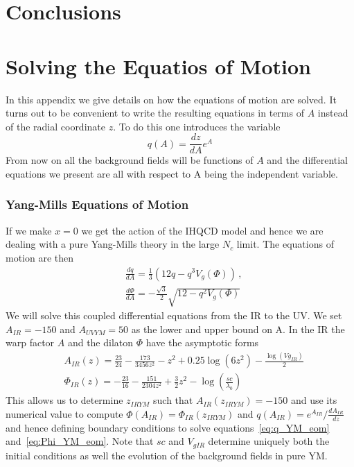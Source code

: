 \documentclass[a4paper,12pt]{article}
\begin{document}
\section{Conclusions}


\appendix

\section{Solving the Equatios of Motion}
\label{appendix:eom_sol}

In this appendix we give details on how the equations of motion are solved. It turns out to be convenient to write the resulting equations in terms of $A$ instead of the radial coordinate $z$. To do this one introduces the variable
\begin{equation}
q\left(A\right) = \frac{dz}{dA} e^{A}
\label{eq: q definition}
\end{equation}
From now on all the background fields will be functions of $A$ and the differential equations we present are all with respect to A being the independent variable.

\subsubsection*{Yang-Mills Equations of Motion}

If we make $x = 0$ we get the action of the IHQCD model and hence we are dealing with a pure Yang-Mills theory in the large $N_c$ limit. The equations of motion are then
\begin{align}
&\frac{dq}{dA} = \frac{1}{3} \left( 12 q - q^3 V_g \left(\Phi\right) \right) \, , \label{eq:q_YM_eom} \\
&\frac{d\Phi}{dA} = - \frac{\sqrt{3}}{2} \sqrt{12 - q^2 V_g\left(\Phi\right)} \label{eq:Phi_YM_eom}
\end{align}
We will solve this coupled differential equations from the IR to the UV. We set $A_{IR} = -150$ and $A_{UVYM} = 50$ as the lower and upper bound on A. In the IR the warp factor $A$ and the dilaton $\Phi$ have the asymptotic forms
\begin{align}
&A_{IR} \left(z\right) = \frac{23}{24} - \frac{173}{3456 z^2} - z^2 + 0.25 \log(6 z^2) - \frac{\log(Vg_{IR})}{2} \\
&\Phi_{IR} \left(z \right) = - \frac{23}{16} - \frac{151}{2304 z^2} + \frac{3}{2} z^2 - \log(\frac{sc}{\lambda_0})
\label{eq: YM fields IR asymptotics}
\end{align}
This allows us to determine $z_{IRYM}$ such that $A_{IR}\left(z_{IRYM}\right) = -150$ and use its numerical value to compute $\Phi\left(A_{IR}\right) = \Phi_{IR} \left( z_{IRYM}\right)$ and $q\left(A_{IR}\right) = e^{A_{IR}} / \frac{dA_{IR}}{d z} $ and hence defining boundary conditions to solve equations~\ref{eq:q_YM_eom} and~\ref{eq:Phi_YM_eom}. Note that $sc$ and $V_{gIR}$ determine uniquely both the initial conditions as well the evolution of the background fields in pure YM.
\end{document}
